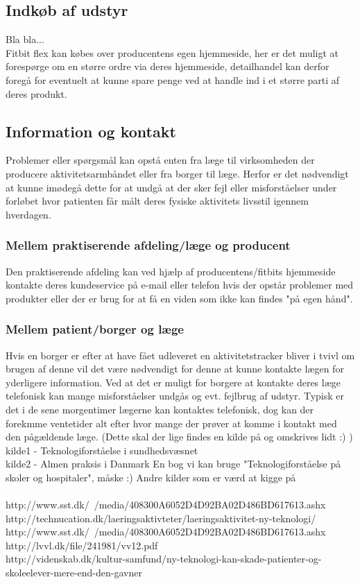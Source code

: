 \subsection{Indkøb af udstyr}	
Bla bla...\\
Fitbit flex kan købes over producentens egen hjemmeside, her er det muligt at forespørge om en større ordre via deres hjemmeside, detailhandel kan derfor foregå for eventuelt at kunne spare penge ved at handle ind i et større parti af deres produkt.

\subsection{Information og kontakt}
Problemer eller spørgsmål kan opstå enten fra læge til virksomheden der producere aktivitetsarmbåndet eller fra borger til læge. Herfor er det nødvendigt at kunne imødegå dette   for at undgå at der sker fejl eller misforståelser under forløbet hvor patienten får målt deres fysiske aktivitets livsstil igennem hverdagen. 

\subsubsection{Mellem praktiserende afdeling/læge og producent}
Den praktiserende afdeling kan ved hjælp af producentens/fitbits hjemmeside kontakte deres kundeservice på e-mail eller telefon hvis der opstår problemer med produkter eller der er brug for at få en viden som ikke kan findes "på egen hånd". 

\subsubsection{Mellem patient/borger og læge}
Hvis en borger er efter at have fået udleveret en aktivitetstracker bliver i tvivl om brugen af denne vil det være nødvendigt for denne at kunne kontakte lægen for yderligere information. Ved at det er muligt for borgere at kontakte deres læge telefonisk kan mange misforståelser undgås og evt. fejlbrug af udstyr. Typisk er det i de sene morgentimer lægerne kan kontaktes telefonisk, dog kan der forekmme ventetider alt efter hvor mange der prøver at komme i kontakt med den pågældende læge.  (Dette skal der lige findes en kilde på og omskrives lidt :) ) \\

kilde1 - Teknologiforståelse i sundhedsvæsnet \\
kilde2 - Almen praksis i Danmark
En bog vi kan bruge "Teknologiforståelse på skoler og hospitaler", måske :) 
Andre kilder som er værd at kigge på \\\\

http://www.sst.dk/~/media/408300A6052D4D92BA02D486BD617613.ashx \\
http://technucation.dk/laeringsaktivteter/laeringsaktivitet-ny-teknologi/ \\
http://www.sst.dk/~/media/408300A6052D4D92BA02D486BD617613.ashx \\
http://lvvl.dk/file/241981/vv12.pdf \\

http://videnskab.dk/kultur-samfund/ny-teknologi-kan-skade-patienter-og-skoleelever-mere-end-den-gavner
